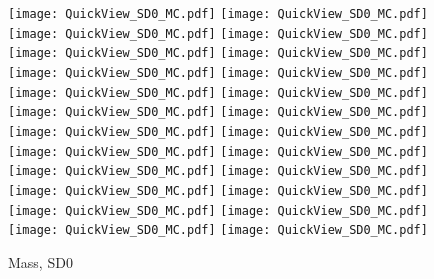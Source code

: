 \documentclass[amsmath,amssymb,aps,floatfix]{revtex4-1}
\begin{document}
\begin{figure}
   \centering
   \texttt{[image: QuickView\_SD0\_MC.pdf]}
   \texttt{[image: QuickView\_SD0\_MC.pdf]}
   \texttt{[image: QuickView\_SD0\_MC.pdf]}
   \texttt{[image: QuickView\_SD0\_MC.pdf]}\\
   \texttt{[image: QuickView\_SD0\_MC.pdf]}
   \texttt{[image: QuickView\_SD0\_MC.pdf]}
   \texttt{[image: QuickView\_SD0\_MC.pdf]}
   \texttt{[image: QuickView\_SD0\_MC.pdf]}\\
   \texttt{[image: QuickView\_SD0\_MC.pdf]}
   \texttt{[image: QuickView\_SD0\_MC.pdf]}
   \texttt{[image: QuickView\_SD0\_MC.pdf]}
   \texttt{[image: QuickView\_SD0\_MC.pdf]}\\
   \texttt{[image: QuickView\_SD0\_MC.pdf]}
   \texttt{[image: QuickView\_SD0\_MC.pdf]}
   \texttt{[image: QuickView\_SD0\_MC.pdf]}
   \texttt{[image: QuickView\_SD0\_MC.pdf]}\\
   \texttt{[image: QuickView\_SD0\_MC.pdf]}
   \texttt{[image: QuickView\_SD0\_MC.pdf]}
   \texttt{[image: QuickView\_SD0\_MC.pdf]}
   \texttt{[image: QuickView\_SD0\_MC.pdf]}\\
   \texttt{[image: QuickView\_SD0\_MC.pdf]}
   \texttt{[image: QuickView\_SD0\_MC.pdf]}
   \texttt{[image: QuickView\_SD0\_MC.pdf]}
   \texttt{[image: QuickView\_SD0\_MC.pdf]}\\
   \caption{Mass, SD0}
   \label{Figure:SD0Result}
\end{figure}
\end{document}
